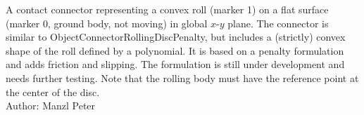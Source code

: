\ei

%
\newpage


\label{sec:item:ObjectContactConvexRoll}
A contact connector representing a convex roll (marker 1) on a flat surface (marker 0, ground body, not moving) in global $x$-$y$ plane. The connector is similar to ObjectConnectorRollingDiscPenalty, but includes a (strictly) convex shape of the roll defined by a polynomial. It is based on a penalty formulation and adds friction and slipping. The formulation is still under development and needs further testing. Note that the rolling body must have the reference point at the center of the disc.
\vspace{12pt}\\

\noindent Author: Manzl Peter
\vspace{12pt}\\

